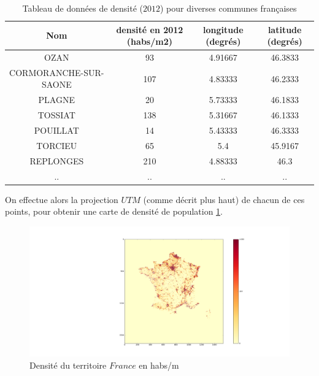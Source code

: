 \documentclass{book}
\begin{document}
\begin{table}
\begin{center}
\begin{tabular}{|c|c|c|c|}
\hline
Nom&densité en 2012 (habs/m2) &longitude (degrés)&latitude (degrés)\\
\hline
OZAN&93&4.91667&46.3833\\
\hline
CORMORANCHE-SUR-SAONE&107&4.83333&46.2333\\
\hline
PLAGNE&20&5.73333&46.1833\\
\hline
TOSSIAT&138&5.31667&46.1333\\
\hline
POUILLAT&14&5.43333&46.3333\\
\hline
TORCIEU&65&5.4&45.9167\\
\hline
REPLONGES&210&4.88333&46.3\\
\hline
..&..&..&..\\
\hline
\end{tabular}
\end{center}
\caption{Tableau de données de densité ($2012$) pour diverses communes françaises}
\label{densite}
\end{table}

\clearpage

On effectue alors la projection $UTM$ (comme décrit plus haut) de chacun de ces points, pour obtenir une carte de densité de population \ref{densite_france}.

\begin{figure}[H]
\begin{center}
\includegraphics[scale=0.2]{images/density_france.png}
\end{center}
\caption{Densité du territoire $France$ en habs/m}
\label{densite_france}
\end{figure}

\clearpage
\end{document}
